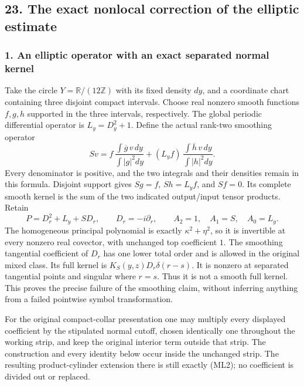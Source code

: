 \documentclass[
  11pt,
]{article}
\makeatletter
\let\ReaderOriginalAnchorStart\hyper@anchorstart
\let\ReaderOriginalAnchorEnd\hyper@anchorend
\let\ReaderPendingAliases\@empty
\def\ReaderArmAliases#1{\gdef\ReaderPendingAliases{#1}}
\def\hyper@anchorstart#1{\ReaderIfNativeAnchorTF{#1}{\ReaderPendingAliases\global\let\ReaderPendingAliases\@empty}{}\ReaderOriginalAnchorStart{#1}}
\makeatother
\begin{document}
\ReaderArmAliases{\ReaderOriginalAnchorStart{AN03-GCF-FOUNDATION-023}\ReaderOriginalAnchorEnd\begingroup\expandafter\def\csname @currentHref\endcsname{AN03-GCF-FOUNDATION-023}\label{AN03-GCF-FOUNDATION-023}\endgroup\ReaderOriginalAnchorStart{boundary-foundation-23}\ReaderOriginalAnchorEnd}
\subsection{23. The exact nonlocal correction of the elliptic
estimate}\label{boundary-foundation-23}

\subsubsection{1. An elliptic operator with an exact separated normal
kernel}\label{an-elliptic-operator-with-an-exact-separated-normal-kernel}

Take the circle \(Y=\mathbb R/(12\mathbb Z)\) with its fixed density
\(dy\), and a coordinate chart containing three disjoint compact
intervals. Choose real nonzero smooth functions \(f,g,h\) supported in
the three intervals, respectively. The global periodic differential
operator is \(L_y=D_y^2+1\). Define the actual rank-two smoothing
operator \[
 Sv=f\,\frac{\int\overline g\,v\,dy}{\int|g|^2dy}
       +(L_yf)\,\frac{\int\overline h\,v\,dy}{\int|h|^2dy}.
 \tag{ML1}
\] Every denominator is positive, and the two integrals and their
densities remain in this formula. Disjoint support gives \(Sg=f\),
\(Sh=L_yf\), and \(Sf=0\). Its complete smooth kernel is the sum of the
two indicated output/input tensor products. Retain \[
 P=D_r^2+L_y+SD_r,
 \qquad D_r=-i\partial_r,
 \qquad A_2=1,\quad A_1=S,\quad A_0=L_y.
 \tag{ML2}
\] The homogeneous principal polynomial is exactly \(\kappa^2+\eta^2\),
so it is invertible at every nonzero real covector, with unchanged top
coefficient \(1\). The smoothing tangential coefficient of \(D_r\) has
one lower total order and is allowed in the original mixed class. Its
full kernel is \(K_S(y,z)D_r\delta(r-s)\). It is nonzero at separated
tangential points and singular where \(r=s\). Thus it is not a smooth
full kernel. This proves the precise failure of the smoothing claim,
without inferring anything from a failed pointwise symbol
transformation.

For the original compact-collar presentation one may multiply every
displayed coefficient by the stipulated normal cutoff, chosen
identically one throughout the working strip, and keep the original
interior term outside that strip. The construction and every identity
below occur inside the unchanged strip. The resulting product-cylinder
extension there is still exactly (ML2); no coefficient is divided out or
replaced.
\end{document}
